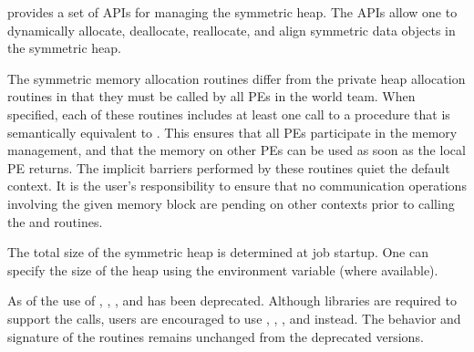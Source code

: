 \openshmem provides a set of \acp{API} for managing the symmetric heap. The
\acp{API} allow one to dynamically allocate, deallocate, reallocate, and align
symmetric data objects in the symmetric heap.

The symmetric memory allocation routines differ from the private heap
allocation routines in that they must be called by all \acp{PE} in
the world team.  When specified, each of these routines includes at
least one call to a procedure that is semantically equivalent to
.  This ensures that all \acp{PE}
participate in the memory management, and that the memory on other
\acp{PE} can be used as soon as the local \ac{PE} returns.  The
implicit barriers performed by these routines quiet the default
context.  It is the user's responsibility to ensure that no
communication operations involving the given memory block are pending
on other contexts prior to calling the  and
 routines.

The total size of the symmetric heap is determined at job startup.  One can
specify the size of the heap using the  environment
variable (where available).	

\begin{DeprecateBlock}
  As of \openshmem[1.2] the use of , ,
  ,  and  has been deprecated. Although \openshmem
  libraries are required to support the calls, users are encouraged to use
  , , , and
   instead.  The behavior and signature  of the routines
  remains unchanged from the deprecated versions.
\end{DeprecateBlock}



